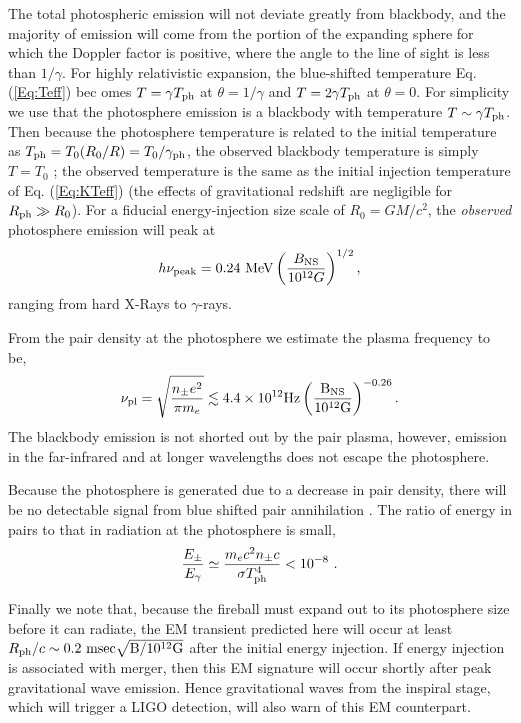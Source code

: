The total photospheric emission will not deviate greatly from
blackbody, and the majority of emission will come from the portion of
the expanding sphere for which the Doppler factor is positive, where
the angle to the line of sight is less than $1/\gamma$. For highly
relativistic expansion, the blue-shifted temperature
Eq. (\ref{Eq:Teff}) bec omes $T = \gamma T_{\rm{ph}}$ at
$\theta=1/\gamma$ and $T = 2 \gamma T_{\rm{ph}}$ at $\theta=0$. For
simplicity we use that the photosphere emission is a blackbody with
temperature $T \sim \gamma T_{\rm{ph}}$. Then because the photosphere
temperature is related to the initial temperature as $T_{\rm ph} =
T_0(R_0/R) = T_0/\gamma_{\rm{ph}}$, the observed blackbody temperature
is simply $T=T_0$ \citep[{\em see also}][]{Pacz:1986GRB}; the observed
temperature is the same as the initial injection temperature of
Eq. (\ref{Eq:KTeff}) (the effects of gravitational redshift are
negligible for $R_{\rm ph}\gg R_0$). For a fiducial energy-injection
size scale of $R_0 = GM/c^2$, the {\em observed} photosphere emission
will peak at
\begin{align}
h \nu_{\rm{peak}} = 0.24 \ \mbox{MeV} \left( \frac{B_{\rm NS}}{10^{12} G} \right)^{1/2} ,
\label{Eq:KTWein}
\end{align}
ranging from hard X-Rays to $\gamma$-rays.

From the pair density at the photosphere we estimate the plasma
frequency to be,
\begin{align}
\nu_{\rm pl} = \sqrt{\frac{ n_{\pm} e^2}{\pi m_e}} \lesssim 4.4 \times 10^{12} \rm{Hz}   \left( \frac{B_{\rm NS}}{10^{12} \rm{G}}\right)^{-0.26} .
\end{align}
The blackbody emission is not shorted out by the pair plasma, however,
emission in the far-infrared and at longer wavelengths does not escape
the photosphere.




Because the photosphere is generated due to a decrease in pair
density, there will be no detectable signal from blue shifted pair
annihilation \citep[{\em see also}][]{Pacz:1986GRB,
  GoodmanGRB:1986}. The ratio of energy in pairs to that in radiation
at the photosphere is small,
\begin{align}
\frac{E_{\pm}}{E_{\gamma}} \simeq \frac{m_e c^2 n_{\pm} c}{\sigma T_{\rm{ph}}^4} < 10^{-8} \ .
\end{align}


Finally we note that, because the fireball must expand out to its
photosphere size before it can radiate, the EM transient predicted
here will occur at least $R_{\rm{ph}}/c \sim 0.2 \ \rm{msec}
\sqrt{B/10^{12}\rm{G}}$ after the initial energy injection. If energy
injection is associated with merger, then this EM signature will occur
shortly after peak gravitational wave emission.  Hence gravitational 
waves from the inspiral stage, which will trigger a LIGO detection, 
will also warn of this EM counterpart.


